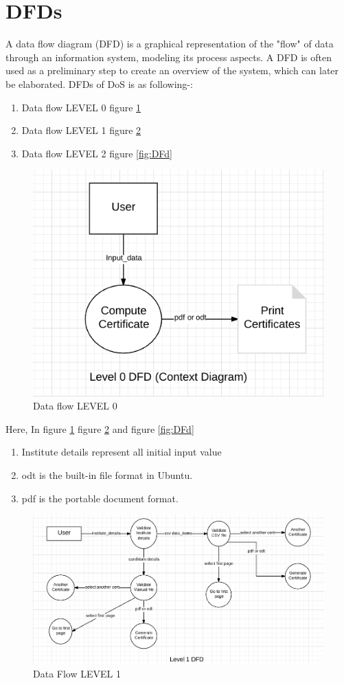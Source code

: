 \section{DFDs}
A data flow diagram (DFD) is a graphical representation of the "flow" of data through an information system, modeling its process aspects. A DFD is often used as a preliminary step to create an overview of the system, which can later be elaborated. DFDs of DoS is as following-:
\begin{enumerate}
\item Data flow LEVEL 0 figure \ref{fig:DFDs}
\item Data flow LEVEL 1 figure \ref{fig:DF}
\item Data flow LEVEL 2 figure \ref{fig:DFd}
\end{enumerate}
\begin{figure}
\centering \includegraphics[scale=0.4]{images/cgs/dfd0.png}
\caption{Data flow LEVEL 0}
\label{fig:DFDs}
\end{figure}
Here, In figure \ref{fig:DFDs} figure \ref{fig:DF} and figure \ref{fig:DFd}
\begin{enumerate}
\item Institute details represent all initial input value
\item odt is the built-in file format in Ubuntu.
\item pdf is the portable document format.
\end{enumerate}
\begin{figure}
\centering \includegraphics[scale=0.55]{images/cgs/dfd_1.png}
\caption{Data Flow LEVEL 1}
\label{fig:DF}
\end{figure}
